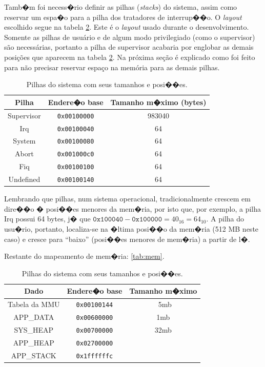 \documentclass{ufscThesis/ufscThesis} %
\begin{document}
Tamb�m foi necess�rio definir as pilhas (\emph{stacks}) do sistema, assim como reservar um espa�o para a pilha dos tratadores de interrup��o. O \emph{layout} escolhido segue na tabela \ref{tab:stacks}.
Este é o \emph{layout} usado durante o desenvolvimento. Somente as pilhas de usuário e de algum modo privilegiado (como o supervisor) são necessárias, portanto a pilha de supervisor acabaria por englobar as demais posições que aparecem na tabela \ref{tab:stacks}. Na próxima seção é explicado como foi feito para não precisar reservar espaço na memória para as demais pilhas.

\begin{table}[hb]
	\centering
	\begin{tabular}{ccc}
		\hline \hline
		Pilha & Endere�o base & Tamanho m�ximo (bytes)\\[0.5ex]
		\hline
		Supervisor		& \verb+0x00100000+ & 983040\\
		Irq			& \verb+0x00100040+ & 64\\
		System			& \verb+0x00100080+ & 64\\
		Abort			& \verb+0x001000c0+ & 64\\
		Fiq			& \verb+0x00100100+ & 64\\
		Undefined		& \verb+0x00100140+ & 64\\[1ex]
		\hline
	\end{tabular}
	\caption{Pilhas do sistema com seus tamanhos e posi��es.}
	\label{tab:stacks}
\end{table}

Lembrando que pilhas, num sistema operacional, tradicionalmente crescem em dire��o � posi��es menores da mem�ria, por isto que, por exemplo, a pilha Irq possui 64 bytes, j� que $\texttt{0x100040}-\texttt{0x100000} = 40_{16} = 64_{10}$. A pilha do usu�rio, portanto, localiza-se na �ltima posi��o da mem�ria (512 MB neste caso) e cresce para ``baixo'' (posi��es menores de mem�ria) a partir de l�.



Restante do mapeamento de mem�ria:
\ref{tab:mem}.
\begin{table}[hb]
	\centering
	\begin{tabular}{ccc}
		\hline \hline
		Dado & Endere�o base & Tamanho m�ximo\\[0.5ex]
		\hline
		Tabela da MMU		& \verb+0x00100144+ & ~5mb\\
		APP\_DATA		& \verb+0x00600000+ & 1mb\\
		SYS\_HEAP		& \verb+0x00700000+ & 32mb\\
		APP\_HEAP		& \verb+0x02700000+ & \\
		APP\_STACK		& \verb+0x1ffffffc+ & \\[1ex]
		\hline
	\end{tabular}
	\caption{Pilhas do sistema com seus tamanhos e posi��es.}
	\label{tab:stacks}
\end{table}
\end{document}
